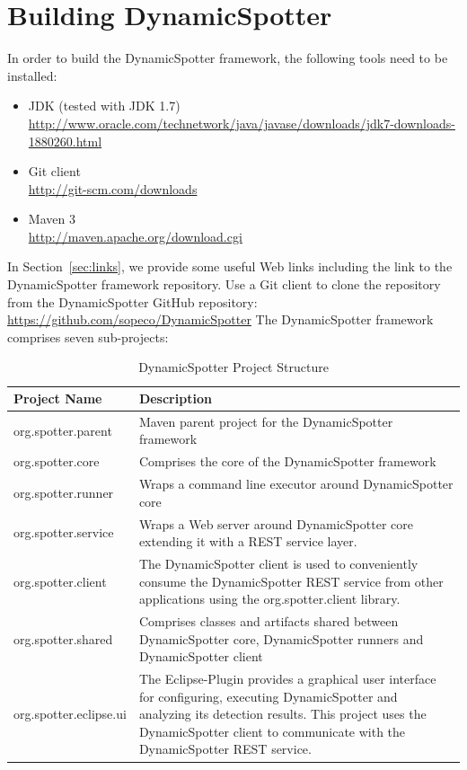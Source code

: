 \documentclass{report}
\newcommand{\DS}{DynamicSpotter }
\newcommand{\link}[1]{\textcolor[rgb]{0.0,0.0,1.0}{\href{#1}{#1}}}
\begin{document}
\newpage
\section{Building \DS}
\label{sec:buildingDynamicSpotter}
In order to build the \DS framework, the following tools need to be installed:
\begin{itemize}
  \item JDK (tested with JDK
  1.7)\\ \link{http://www.oracle.com/technetwork/java/javase/downloads/jdk7-downloads-1880260.html}
  \item Git client \\ \link{http://git-scm.com/downloads}
  \item Maven 3 \\ \link{http://maven.apache.org/download.cgi}
\end{itemize}

In Section~\ref{sec:links}, we provide some useful Web links including the link to the \DS framework repository. 
Use a Git client to clone the repository from the \DS GitHub repository:
\newline
\newline
\link{https://github.com/sopeco/DynamicSpotter}
\newline
\newline
The \DS framework comprises seven sub-projects:

\begin{table}[h]
\centering
\begin{tabular}{p{}p{}}
\toprule
 \textbf{Project Name} & \textbf{Description}\\
\midrule
org.spotter.parent & Maven parent project for the \DS framework\\
\midrule
org.spotter.core & Comprises the core of the \DS framework\\
\midrule
org.spotter.runner & Wraps a command line executor around \DS core\\
\midrule
org.spotter.service & Wraps a Web server around \DS core extending it with a REST service layer.\\
\midrule
org.spotter.client & The \DS client is used to conveniently consume the \DS REST service from other applications using
the org.spotter.client library.\\
\midrule
org.spotter.shared & Comprises classes and artifacts shared between \DS core, \DS runners and \DS client\\
\midrule
org.spotter.eclipse.ui & The Eclipse-Plugin provides a graphical user interface for configuring, executing \DS and
analyzing its detection results. This project uses the \DS client to communicate with the \DS REST service.\\
\bottomrule
\end{tabular}
\caption{\DS Project Structure}
\label{tab:projects}
\end{table}
\end{document}
